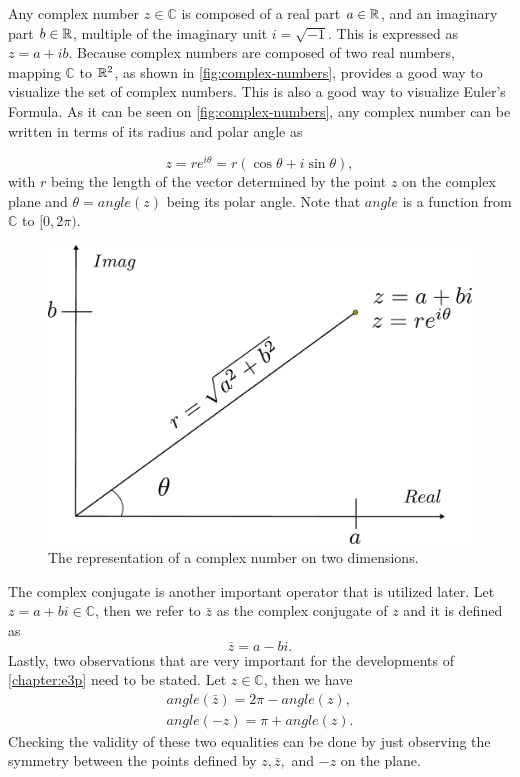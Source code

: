 Any complex number $z\in\mathbb{C}$ is composed of a real part $a\in\mathbb{R}$, and an imaginary part $b\in\mathbb{R}$, multiple of the imaginary unit $i = \sqrt{-1}$. This is expressed as $z=a+ib$. 
Because complex numbers are composed of two real numbers, mapping $\mathbb{C}$ to $\mathbb{R}^2$, as shown in  \autoref{fig:complex-numbers}, provides a good way to visualize the set of complex numbers. 
This is also a good way to visualize Euler's Formula. As it can be seen on \autoref{fig:complex-numbers}, any complex number can be written in terms of its radius and polar angle as

\begin{equation*}
z = re^{i\theta}=r(\cos{\theta} + i\sin{\theta}),
\end{equation*}
with $r$ being the length of the vector determined by the point $z$ on the complex plane and $\theta = angle(z)$ being its polar angle. Note that $angle$ is a function from $\mathbb{C}$ to $[0, 2\pi)$.
\begin{figure}[ht]
	\centering
	\def\svgwidth{\columnwidth}
	\includegraphics[scale=.37]{tex/figures/complex_numbers}
	\caption{The representation of a complex number on two dimensions.}
	\label{fig:complex-numbers}
\end{figure}

The complex conjugate is another important operator that is utilized later. Let $z = a + bi \in \mathbb{C}$, then we refer to $\bar{z}$ as the complex conjugate of $z$ and it is defined as
\begin{equation*}
\bar{z} = a - bi.
\end{equation*}
Lastly, two observations that are very important for the developments of \autoref{chapter:e3p} need to be stated. Let $z\in \mathbb{C}$, then we have 
\begin{align*}
angle(\bar{z}) = 2\pi-angle(z),\\
angle(-z) = \pi + angle(z).
\end{align*}
Checking the validity of these two equalities can be done by just observing the symmetry between the points defined by $z, \bar{z},$ and $-z$ on the plane.


